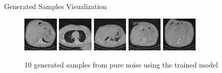 \begin{frame}{Generated Samples Visualization}
\begin{figure}
        \includegraphics[width=0.15\textwidth]{media/epoch_81_5.png}\hspace{0.5em}
        \includegraphics[width=0.15\textwidth]{media/epoch_81_6.png}\hspace{0.5em}
        \includegraphics[width=0.15\textwidth]{media/epoch_81_7.png}\hspace{0.5em}
        \includegraphics[width=0.15\textwidth]{media/epoch_81_8.png}\hspace{0.5em}
        \includegraphics[width=0.15\textwidth]{media/epoch_81_9.png}

        \caption{10 generated samples from pure noise using the trained model}
        \label{fig:generated_samples_from_pure_noise}
    \end{figure}
\end{frame}
